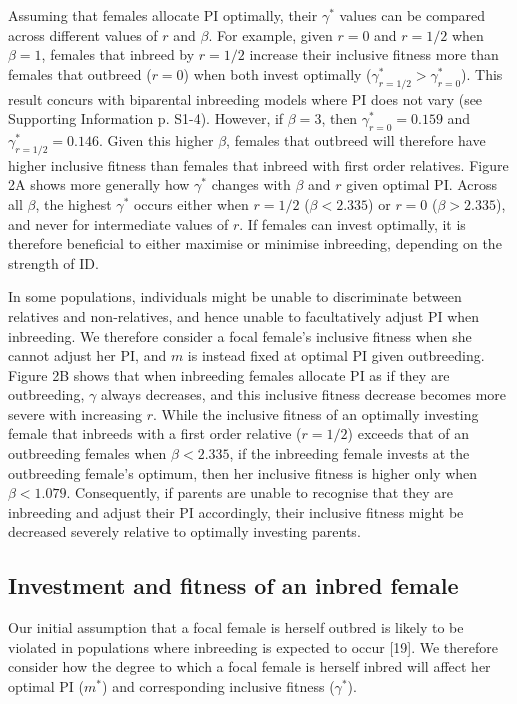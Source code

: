 \documentclass[12pt]{article}
\begin{document}
Assuming that females allocate PI optimally, their $\gamma^{*}$ values can be compared across different values of $r$ and $\beta$. For example, given $r=0$ and $r=1/2$ when $\beta=1$, females that inbreed by $r=1/2$ increase their inclusive fitness more than females that outbreed ($r=0$) when both invest optimally ($\gamma^{*}_{r=1/2}>\gamma^{*}_{r=0}$). This result concurs with biparental inbreeding models where PI does not vary (see Supporting Information p. S1-4). However, if $\beta=3$, then $\gamma^{*}_{r=0}=0.159$ and $\gamma^{*}_{r=1/2}=0.146$. Given this higher $\beta$, females that outbreed will therefore have higher inclusive fitness than females that inbreed with first order relatives. Figure 2A shows more generally how $\gamma^{*}$ changes with $\beta$ and $r$ given optimal PI. Across all $\beta$, the highest $\gamma^{*}$ occurs either when $r=1/2$ ($\beta < 2.335$) or $r=0$ ($\beta > 2.335$), and never for intermediate values of $r$. If females can invest optimally, it is therefore beneficial to either maximise or minimise inbreeding, depending on the strength of ID.

In some populations, individuals might be unable to discriminate between relatives and non-relatives, and hence unable to facultatively adjust PI when inbreeding. We therefore consider a focal female's inclusive fitness when she cannot adjust her PI, and $m$ is instead fixed at optimal PI given outbreeding. Figure 2B shows that when inbreeding females allocate PI as if they are outbreeding, $\gamma$ always decreases, and this inclusive fitness decrease becomes more severe with increasing $r$. While the inclusive fitness of an optimally investing female that inbreeds with a first order relative ($r=1/2$) exceeds that of an outbreeding females when $\beta < 2.335$, if the inbreeding female invests at the outbreeding female's optimum, then her inclusive fitness is higher only when $\beta < 1.079$. Consequently, if parents are unable to recognise that they are inbreeding and adjust their PI accordingly, their inclusive fitness might be decreased severely relative to optimally investing parents.


\subsection*{Investment and fitness of an inbred female}

Our initial assumption that a focal female is herself outbred is likely to be violated in populations where inbreeding is expected to occur [19]. We therefore consider how the degree to which a focal female is herself inbred will affect her optimal PI ($m^{*}$) and corresponding inclusive fitness ($\gamma^{*}$).
\end{document}
